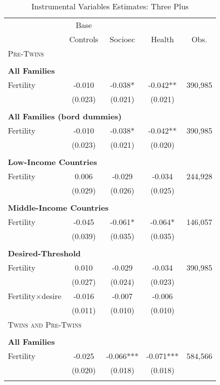 \begin{table}[!htbp] \centering 
\caption{Instrumental Variables Estimates: Three Plus} \vspace{4mm} 
\label{TWINtab:IVThreeplus} 
\begin{tabular}{lcccc} \toprule \toprule 
&Base&&&\\
&Controls&Socioec&Health&Obs.\\\midrule
\multicolumn{5}{l}{\textsc{Pre-Twins}}\\ 
&&&&\\
\multicolumn{5}{l}{\textbf{All Families}}\\ 
Fertility&-0.010&-0.038*&-0.042**&390,985\\
         &(0.023)&(0.021)&(0.021)&\\
&&&&\\
\multicolumn{5}{l}{\textbf{All Families (bord dummies)}}\\ 
Fertility&-0.010&-0.038*&-0.042**&390,985\\
         &(0.023)&(0.021)&(0.020)&\\
&&&&\\
\multicolumn{5}{l}{\textbf{Low-Income Countries}}\\ 
Fertility&0.006&-0.029&-0.034&244,928\\
         &(0.029)&(0.026)&(0.025)&\\
&&&&\\
\multicolumn{5}{l}{\textbf{Middle-Income Countries}}\\ 
Fertility&-0.045&-0.061*&-0.064*&146,057\\
         &(0.039)&(0.035)&(0.035)&\\
&&&&\\
\multicolumn{5}{l}{\textbf{Desired-Threshold}}\\ 
Fertility&0.010&-0.029&-0.034&390,985\\
         &(0.027)&(0.024)&(0.023)&\\
Fertility$\times$desire&-0.016&-0.007&-0.006&\\
         &(0.011)&(0.010)&(0.010)&\\
\midrule\multicolumn{5}{l}{\textsc{Twins and Pre-Twins}}\\ 
&&&&\\
\multicolumn{5}{l}{\textbf{All Families}}\\ 
Fertility&-0.025&-0.066***&-0.071***&584,566\\
         &(0.020)&(0.018)&(0.018)&\\
&&&&\\

\end{tabular}
\end{table}
